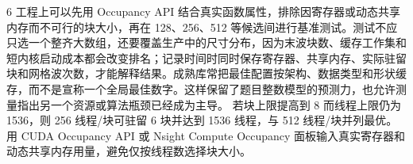 \begin{solutionexercise}{6}
工程上可以先用 Occupancy API 结合真实函数属性，排除因寄存器或动态共享内存而不可行的块大小，再在 128、256、512 等候选间进行基准测试。测试不应只选一个整齐大数组，还要覆盖生产中的尺寸分布，因为末波块数、缓存工作集和短内核启动成本都会改变排名；记录时间时同时保存寄存器、共享内存、实际驻留块和网格波次数，才能解释结果。成熟库常把最佳配置按架构、数据类型和形状缓存，而不是宣称一个全局最佳数字。这样保留了题目整数模型的预测力，也允许测量指出另一个资源或算法瓶颈已经成为主导。
\variantheading 若块上限提高到 8 而线程上限仍为 1536，则 256 线程/块可驻留 6 块并达到 1536 线程，与 512 线程/块并列最优。
\practiceheading 用 CUDA Occupancy API 或 Nsight Compute Occupancy 面板输入真实寄存器和动态共享内存用量，避免仅按线程数选择块大小。
\end{solutionexercise}

